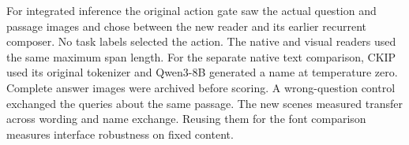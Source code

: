 For integrated inference the original action gate saw the actual question and passage images and chose between the new reader and its earlier recurrent composer. No task labels selected the action. The native and visual readers used the same maximum span length. For the separate native text comparison, CKIP used its original tokenizer and Qwen3-8B generated a name at temperature zero. Complete answer images were archived before scoring. A wrong-question control exchanged the queries about the same passage. The new scenes measured transfer across wording and name exchange. Reusing them for the font comparison measures interface robustness on fixed content.
